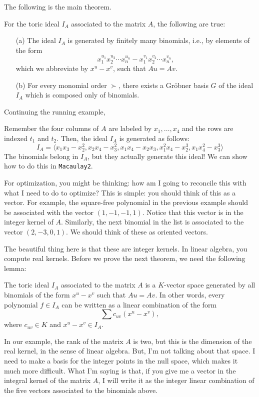 The following is the main theorem.
\begin{theorem}
For the toric ideal $I_A$ associated to the matrix $A$, the following are true:
\begin{enumerate}
\item[(a)] The ideal $I_A$ is generated by finitely many binomials, i.e., by elements of the form
\[ x_1^{u_1}x_2^{u_2} \cdots x_n^{u_n} - x_1^{v_1}x_2^{v_2} \cdots x_n^{v_n}, \]
which we abbreviate by $x^u - x^v$, such that $Au = Av$.
\item[(b)] For every monomial order $\succ$, there exists a Gr\"obner basis $G$ of the ideal $I_A$ which is composed only of binomials.
\end{enumerate}
\end{theorem}

Continuing the running example,
\begin{example}
Remember the four columns of $A$ are labeled by $x_1,\ldots, x_4$ and the rows are indexed $t_1$ and $t_2$. Then, the ideal $I_A$ is generated as follows:
\[ I_A = \langle x_1x_3 - x_2^2 , x_2x_4 - x_3^2, x_1x_4 - x_2x_3, x_1^2x_4 -x_2^3, x_1x_4^2 - x_3^3 \rangle\]
The binomials belong in $I_A$, but they actually generate this ideal! We can show how to do this in {\tt Macaulay2}.
\end{example}
For optimization, you might be thinking: how am I going to reconcile this with what I need to do to optimize? This is simple: you should think of this as a vector. For example, the square-free polynomial in the previous example should be associated with the vector $(1,-1,-1,1)$. Notice that this vector is in the integer kernel of $A$. Similarly, the next binomial in the list is associated to the vector $(2,-3,0,1)$. We should think of these as oriented vectors.

The beautiful thing here is that these are integer kernels. In linear algebra, you compute real kernels. Before we prove the next theorem, we need the following lemma:
\begin{lemma}\label{lemma:toricgenerated}
The toric ideal $I_A$ associated to the matrix $A$ is a $K$-vector space generated by all binomials of the form $x^u - x^v$ such that $Au = Av$. In other words, every polynomial $f \in I_A$ can be written as a linear combination of the form
\begin{equation}\label{equation:happyface}
\sum c_{uv}(x^u - x^v),
\end{equation}
where $c_{uv} \in K$ and $x^u - x^v \in I_A$.
\end{lemma}
In our example, the rank of the matrix $A$ is two, but this is the dimension of the real kernel, in the sense of linear algebra. But, I'm not talking about that space. I need to make a basis for the integer points in the null space, which makes it much more difficult. What I'm saying is that, if you give me a vector in the integral kernel of the matrix $A$, I will write it as the integer linear combination of the five vectors associated to the binomials above.


